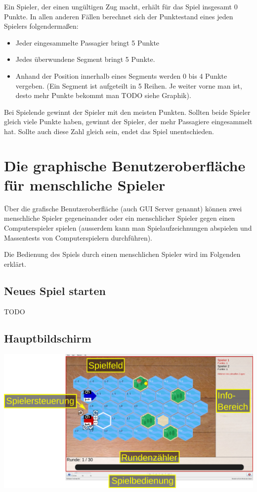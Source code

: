 \documentclass[12pt,a4paper, ngerman, oneside]{scrartcl}
\begin{document}
Ein Spieler, der einen ungültigen Zug macht, erhält für das Spiel insgesamt 0
Punkte. In allen anderen Fällen berechnet sich der Punktestand eines jeden
Spielers folgendermaßen:

\begin{itemize}
  \item Jeder eingesammelte Passagier bringt 5 Punkte
  \item Jedes überwundene Segment bringt 5 Punkte.
  \item Anhand der Position innerhalb eines Segments werden 0 bis 4 Punkte
    vergeben. (Ein Segment ist aufgeteilt in 5 Reihen. Je weiter vorne man ist,
    desto mehr Punkte bekommt man TODO siehe Graphik).
\end{itemize}

Bei Spielende gewinnt der Spieler mit den meisten Punkten. Sollten beide Spieler
gleich viele Punkte haben, gewinnt der Spieler, der mehr Passagiere eingesammelt
hat. Sollte auch diese Zahl gleich sein, endet das Spiel unentschieden.

\section{Die graphische Benutzeroberfläche für menschliche Spieler}

Über die grafische Benutzeroberfläche (auch GUI Server genannt) können zwei
menschliche Spieler gegeneinander oder ein menschlicher Spieler gegen einen
Computerspieler spielen (ausserdem kann man Spielaufzeichnungen abspielen und
Massentests von Computerspielern durchführen).

Die Bedienung des Spiels durch einen menschlichen Spieler wird im Folgenden
erklärt.

\subsection{Neues Spiel starten}

TODO

\subsection{Hauptbildschirm}

\begin{centering}
  \includegraphics[width=\textwidth]{bilder/gui-elemente.pdf}
\end{centering}
\end{document}
